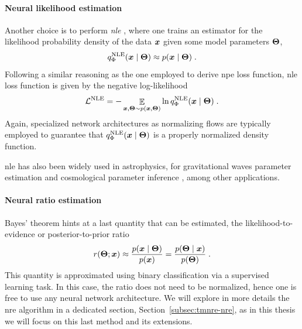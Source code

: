 \paragraph*{Neural likelihood estimation}

Another choice is to perform \emph{\gls*{nle}} \cite{Papamakarios:2018aa, Durkan:2018aa}, where one trains an estimator for the likelihood probability density of the data $\bm{x}$ given some model parameters $\bm{\Theta}$, 
\begin{equation}
    q^\text{NLE}_\Phi(\bm{x} \mid \bm{\Theta}) \approx p(\bm{x}\mid\bm{\Theta})\;.
\end{equation}
Following a similar reasoning as the one employed to derive \gls*{npe} loss function, \gls*{nle} loss function is given by the negative log-likelihood
%
\begin{equation}
	\mathcal{L}^\text{NLE}=-\mathop{\mathbb{E}}\limits_{\bm{x}, \bm{\Theta} \sim p(\bm{x}, \bm{\Theta})} \ln q^\text{NLE}_\Phi(\bm{x} \mid \bm{\Theta}) \;.
\end{equation}
%
Again, specialized network architectures as normalizing flows are typically employed to guarantee that $q^\text{NLE}_\Phi(\bm{x} \mid \bm{\Theta})$ is a properly normalized density function.

\Gls*{nle} has also been widely used in astrophysics, for gravitational waves parameter estimation \cite{Vilchez:2024qnw} and cosmological parameter inference \cite{Alsing:2019xrx, Modi:2023drt, Makinen:2021nly, DES:2024xij, Jeffrey:2020aa}, among other applications.



\paragraph*{Neural ratio estimation}

Bayes' theorem hints at a last quantity that can be estimated, the likelihood-to-evidence or posterior-to-prior ratio 
\begin{equation}
	r(\bm{\Theta};\bm{x})\approx\frac{p(\bm{x}\mid\bm{\Theta})}{p(\bm{x})}=\frac{p(\bm{\Theta}\mid\bm{x})}{p(\bm{\Theta})}\; .
\end{equation}
This quantity is approximated using binary classification via a supervised learning task. In this case, the ratio does not need to be normalized, hence one is free to use any neural network architecture. We will explore in more details the \gls*{nre} algorithm in a dedicated section, Section~\ref{subsec:tmnre-nre}, as in this thesis we will focus on this last method and its extensions.


